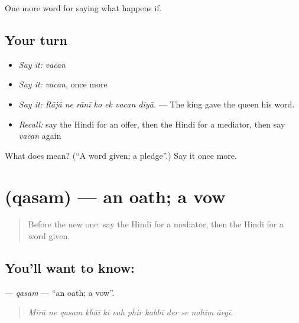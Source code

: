 \begin{grammarlens}[title={What you've built}]
One more word for saying what happens if.
\end{grammarlens}

\subsection*{Your turn}
\begin{itemize}
\raggedright
  \item \emph{Say it:} \emph{vacan}
  \item \emph{Say it:} \emph{vacan}, once more
  \item \emph{Say it:} \emph{Rājā ne rānī ko ek vacan diyā.} — The king gave the queen his word.
  \item \emph{Recall:} say the Hindi for an offer, then the Hindi for a mediator, then say \emph{vacan} again
\end{itemize}

\begin{tcolorbox}[breakable,colback=teal!4,colframe=teal!35!black,title={Before you move on}]
What does  mean? (\textquotedblleft{}A word given; a pledge\textquotedblright{}.) Say it once more.
\end{tcolorbox}
\section[\texorpdfstring{\hi{क़सम} (qasam)}{क़सम (qasam)}]{ (qasam) — an oath; a vow}

\label{lesson:HI-C543-qasam}



\begin{quote}
Before the new one: say the Hindi for a mediator, then the Hindi for a word given.
\end{quote}

\subsection*{You'll want to know: }
\textbf{} — \emph{qasam} — \textquotedblleft{}an oath; a vow\textquotedblright{}.

\begin{quote}
           
\end{quote}

\begin{quote}
\emph{Mīrā ne qasam khāī ki vah phir kabhī der se nahīṃ āegī.}
\end{quote}

